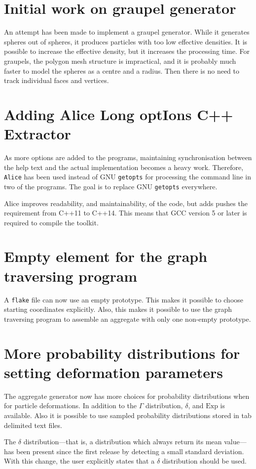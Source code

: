 \documentclass[a4paper,10pt]{scrartcl}
\newcommand{\prgname}[1]{\texttt{#1}}
\begin{document}
\section{Initial work on graupel generator}
An attempt has been made to implement a graupel generator. While it generates spheres out of spheres, it produces particles with too low effective densities. It is possible to increase the effective density, but it increases the processing time. For graupels, the polygon mesh structure is impractical, and it is probably much faster to model the spheres as a centre and a radius. Then there is no need to track individual faces and vertices.

\section{Adding Alice Long optIons C++ Extractor}
As more options are added to the programs, maintaining synchronisation between the help text and the actual implementation becomes a heavy work. Therefore, \prgname{Alice}\cite{alice} has been used instead of GNU \prgname{getopts} for processing the command line in two of the programs. The goal is to replace GNU \prgname{getopts} everywhere.

Alice improves readability, and maintainability, of the code, but adds pushes the requirement from C++11 to C++14. This means that GCC version 5 or later\cite{GCC} is required to compile the toolkit.

\section{Empty element for the graph traversing program}
A \texttt{flake} file can now use an empty prototype. This makes it possible to choose starting coordinates explicitly. Also, this makes it possible to use the graph traversing program to assemble an aggregate with only one non-empty prototype.

\section{More probability distributions for setting deformation parameters}
The aggregate generator now has more choices for probability distributions when for particle deformations. In addition to the $\Gamma$ distribution, $\delta$, and $\text{Exp}$ is available. Also it is possible to use sampled probability distributions stored in tab delimited text files.

The $\delta$ distribution---that is, a distribution which always return its mean value---has been present since the first release by detecting a small standard deviation. With this change, the user explicitly states that a $\delta$ distribution should be used.
\end{document}
